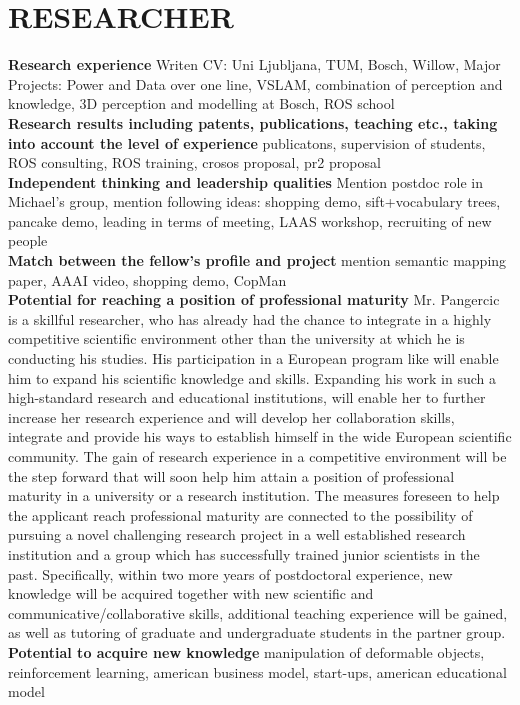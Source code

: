 \section{RESEARCHER} %
\label{sec:researcher}
\textbf{Research experience}
Writen CV: Uni Ljubljana, TUM, Bosch, Willow, 
Major Projects: Power and Data over one line, VSLAM, combination of perception and knowledge, 3D perception 
and modelling at Bosch, ROS school \\
\textbf{Research results including patents, publications, teaching etc., taking into account the level 
of experience} publicatons, supervision of students, ROS consulting, ROS training, crosos proposal, pr2 proposal\\
\textbf{Independent thinking and leadership qualities} 
Mention postdoc role in Michael's group, mention following ideas: shopping demo, sift+vocabulary trees, pancake demo, 
leading in terms of meeting, LAAS workshop, recruiting of new people\\
\textbf{Match between the fellow's profile and project}
mention semantic mapping paper, AAAI video, shopping demo, CopMan\\
\textbf{Potential for reaching a position of professional maturity}
Mr. Pangercic is a skillful researcher, who has already had the chance to integrate in a highly 
competitive scientific environment other than the university at which he is conducting his
studies.  His participation in a European program like \ksem will enable him to expand 
his scientific knowledge and skills. Expanding his work in such a high-standard research 
and educational institutions, will enable her to further increase her 
research experience and will develop her collaboration skills, integrate and  provide his 
ways to establish himself in the wide European scientific community. The gain of research 
experience in a competitive environment will be the step forward that will soon help him
attain a position of professional maturity in a university or a research institution. The 
measures foreseen to help the applicant reach professional maturity are connected to the 
possibility of pursuing a novel challenging research project in a well established research 
institution and a group which has successfully trained junior scientists in the past. 
Specifically, within two more years of postdoctoral experience, new knowledge will be 
acquired together with new scientific and communicative/collaborative skills, additional 
teaching experience will be gained, as well as tutoring of graduate and undergraduate 
students in the partner group. \\
\textbf{Potential to acquire new knowledge}
manipulation of deformable objects, reinforcement learning,  american business model, start-ups, 
american educational model\\

\newpage

